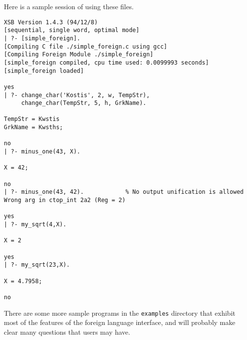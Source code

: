 Here is a sample session of using these files.
\begin{small}
\begin{verbatim}
XSB Version 1.4.3 (94/12/8)
[sequential, single word, optimal mode]
| ?- [simple_foreign].
[Compiling C file ./simple_foreign.c using gcc]
[Compiling Foreign Module ./simple_foreign]
[simple_foreign compiled, cpu time used: 0.0099993 seconds]
[simple_foreign loaded]

yes
| ?- change_char('Kostis', 2, w, TempStr),
     change_char(TempStr, 5, h, GrkName).

TempStr = Kwstis
GrkName = Kwsths;

no
| ?- minus_one(43, X).

X = 42;

no
| ?- minus_one(43, 42).	           % No output unification is allowed
Wrong arg in ctop_int 2a2 (Reg = 2)

yes
| ?- my_sqrt(4,X). 

X = 2

yes
| ?- my_sqrt(23,X).

X = 4.7958;

no
\end{verbatim}
\end{small}

There are some more sample programs in the {\tt examples} directory that
exhibit most of the features of the foreign language interface, and
will probably make clear many questions that users may have.


